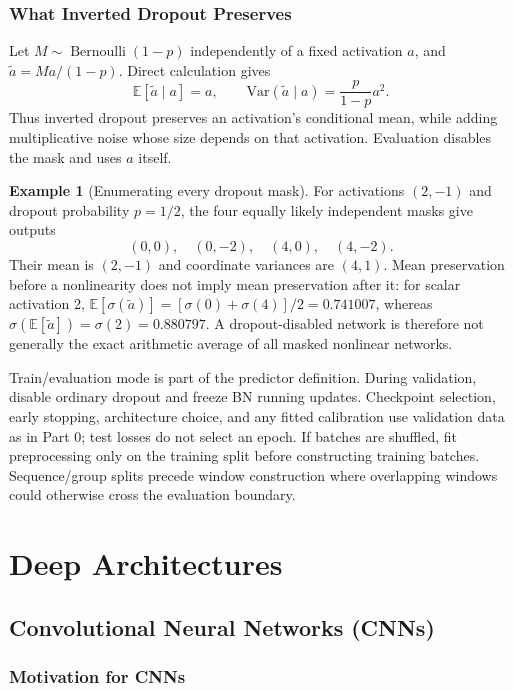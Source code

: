 \documentclass[11pt,twoside]{article}
\numberwithin{equation}{section}
\newcommand{\E}{\mathbb{E}}
\newcommand{\Var}{\mathrm{Var}}
\theoremstyle{plain}
\theoremstyle{definition}
\newtheorem{example}[theorem]{Example}
\theoremstyle{remark}
\begin{document}
\subsubsection{What Inverted Dropout Preserves}
Let $M\sim\operatorname{Bernoulli}(1-p)$ independently of a fixed activation $a$, and $\tilde a=Ma/(1-p)$. Direct calculation gives
\[
\E[\tilde a\mid a]=a,\qquad
\Var(\tilde a\mid a)=\frac{p}{1-p}a^2.
\]
Thus inverted dropout preserves an activation's conditional mean, while adding multiplicative noise whose size depends on that activation. Evaluation disables the mask and uses $a$ itself.

\begin{example}[Enumerating every dropout mask]
For activations $(2,-1)$ and dropout probability $p=1/2$, the four equally likely independent masks give outputs
\[
(0,0),\quad(0,-2),\quad(4,0),\quad(4,-2).
\] Their mean is $(2,-1)$ and coordinate variances are $(4,1)$. Mean preservation before a nonlinearity does not imply mean preservation after it: for scalar activation 2, $\E[\sigma(\tilde a)]=[\sigma(0)+\sigma(4)]/2=0.741007$, whereas $\sigma(\E[\tilde a])=\sigma(2)=0.880797$. A dropout-disabled network is therefore not generally the exact arithmetic average of all masked nonlinear networks.
\end{example}
Train/evaluation mode is part of the predictor definition. During validation, disable ordinary dropout and freeze BN running updates. Checkpoint selection, early stopping, architecture choice, and any fitted calibration use validation data as in Part 0; test losses do not select an epoch. If batches are shuffled, fit preprocessing only on the training split before constructing training batches. Sequence/group splits precede window construction where overlapping windows could otherwise cross the evaluation boundary.

\section{Deep Architectures}
\label{sec:architectures}

\subsection{Convolutional Neural Networks (CNNs)}

\subsubsection{Motivation for CNNs}
\end{document}
